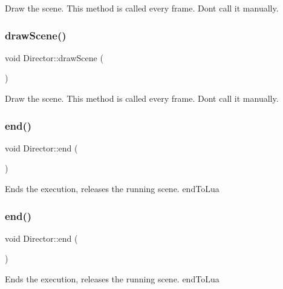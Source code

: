 Draw the scene. This method is called every frame. Don\textquotesingle{}t call it manually. \mbox{\label{classDirector_a9ab4f229ddfcf735ded9b8f25e091481}} 
\subsubsection{\texorpdfstring{draw\+Scene()}{drawScene()}\hspace{0.1cm}{\footnotesize\ttfamily [2/2]}}
{\footnotesize\ttfamily void Director\+::draw\+Scene (\begin{DoxyParamCaption}{ }\end{DoxyParamCaption})}

Draw the scene. This method is called every frame. Don\textquotesingle{}t call it manually. \mbox{\label{classDirector_ac609b09cf1e1054e588d2d25ecd51c36}} 
\subsubsection{\texorpdfstring{end()}{end()}\hspace{0.1cm}{\footnotesize\ttfamily [1/2]}}
{\footnotesize\ttfamily void Director\+::end (\begin{DoxyParamCaption}{ }\end{DoxyParamCaption})}

Ends the execution, releases the running scene.  end\+To\+Lua \mbox{\label{classDirector_ac609b09cf1e1054e588d2d25ecd51c36}} 
\subsubsection{\texorpdfstring{end()}{end()}\hspace{0.1cm}{\footnotesize\ttfamily [2/2]}}
{\footnotesize\ttfamily void Director\+::end (\begin{DoxyParamCaption}{ }\end{DoxyParamCaption})}

Ends the execution, releases the running scene.  end\+To\+Lua \mbox{\label{classDirector_aecb253e4de577ebd009367f27d2a07de}} 
